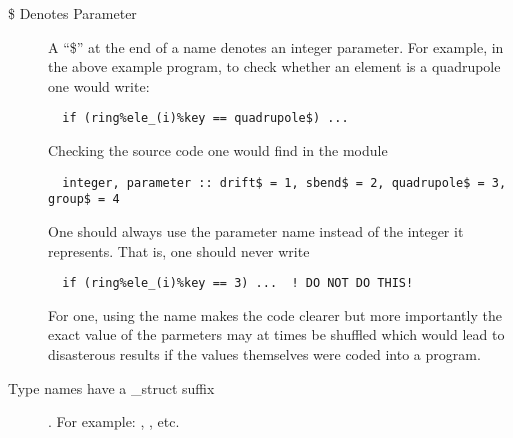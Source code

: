 \begin{description}
\item[\$ Denotes Parameter] A ``\$'' at the end of a name denotes an 
integer parameter. For example, in the above example program, to check
whether an element is a quadrupole one would write:
\begin{verbatim}
  if (ring%ele_(i)%key == quadrupole$) ...
\end{verbatim}
Checking the source code one would find in the module 
\begin{verbatim}
  integer, parameter :: drift$ = 1, sbend$ = 2, quadrupole$ = 3, group$ = 4
\end{verbatim}
One should always use the parameter name instead of the integer it represents.
That is, one should never write
\begin{verbatim}
  if (ring%ele_(i)%key == 3) ...  ! DO NOT DO THIS!
\end{verbatim}
For one, using the name makes the code clearer but more importantly
the exact value of the parmeters may at times be shuffled which would
lead to disasterous results if the values themselves were coded into a
program.

\item[ Type names have a \_struct suffix]. For example: \ringstruct, 
\elestruct, etc.


\end{description}
